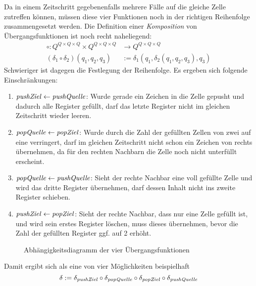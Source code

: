 \documentclass{article}
\begin{document}
Da in einem Zeitschritt gegebenenfalls mehrere Fälle auf die gleiche Zelle zutreffen können, müssen diese vier Funktionen noch in der richtigen Reihenfolge zusammengesetzt werden. Die Definition einer \emph{Komposition} von Übergangsfunktionen ist noch recht naheliegend:
\begin{align*}
    \circ : Q^{Q \times Q \times Q} \times Q^{Q \times Q \times Q} &\rightarrow Q^{Q \times Q \times Q} \\
    (\delta_1 \circ \delta_2)(q_1,q_2,q_3) &:= \delta_1(q_1,\delta_2(q_1,q_2,q_3),q_3)
\end{align*}
Schwieriger ist dagegen die Festlegung der Reihenfolge. Es ergeben sich folgende Einschränkungen:
\begin{enumerate}
    \item $\mathit{pushZiel} \leftarrow \mathit{pushQuelle}$: Wurde gerade ein Zeichen in die Zelle gepusht und dadurch alle Register gefüllt, darf \pushQuelle das letzte Register nicht im gleichen Zeitschritt wieder leeren.
    \item $\mathit{popQuelle} \leftarrow \mathit{popZiel}$: Wurde durch \popQuelle die Zahl der gefüllten Zellen von zwei auf eine verringert, darf \popZiel im gleichen Zeitschritt nicht schon ein Zeichen von rechts übernehmen, da für den rechten Nachbarn die Zelle noch nicht unterfüllt erscheint.
    \item $\mathit{popQuelle} \leftarrow \mathit{pushQuelle}$: Sieht der rechte Nachbar eine voll gefüllte Zelle und wird das dritte Register übernehmen, darf \pushQuelle dessen Inhalt nicht ins zweite Register schieben.
    \item $\mathit{pushZiel} \leftarrow \mathit{popZiel}$: Sieht der rechte Nachbar, dass nur eine Zelle gefüllt ist, und wird sein erstes Register löschen, muss \popZiel dieses übernehmen, bevor \pushZiel die Zahl der gefüllten Register ggf. auf 2 erhöht.
\end{enumerate}

\begin{figure}[h]
    \centering
    \caption{Abhängigkeitsdiagramm der vier Übergangsfunktionen}
\end{figure}
Damit ergibt sich als eine von vier Möglichkeiten beispielhaft
    \[ \delta := \delta_{\mathit{pushZiel}} \circ \delta_{\mathit{popQuelle}} \circ \delta_{\mathit{popZiel}} \circ \delta_{\mathit{pushQuelle}} \]
\end{document}
